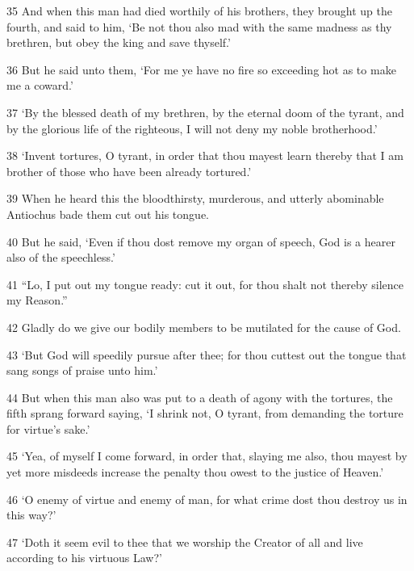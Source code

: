 \par 35 And when this man had died worthily of his brothers, they brought up the fourth, and said to him, ‘Be not thou also mad with the same madness as thy brethren, but obey the king and save thyself.’

\par 36 But he said unto them, ‘For me ye have no fire so exceeding hot as to make me a coward.’

\par 37 ‘By the blessed death of my brethren, by the eternal doom of the tyrant, and by the glorious life of the righteous, I will not deny my noble brotherhood.’

\par 38 ‘Invent tortures, O tyrant, in order that thou mayest learn thereby that I am brother of those who have been already tortured.’

\par 39 When he heard this the bloodthirsty, murderous, and utterly abominable Antiochus bade them cut out his tongue.

\par 40 But he said, ‘Even if thou dost remove my organ of speech, God is a hearer also of the speechless.’

\par 41 “Lo, I put out my tongue ready: cut it out, for thou shalt not thereby silence my Reason.”

\par 42 Gladly do we give our bodily members to be mutilated for the cause of God.

\par 43 ‘But God will speedily pursue after thee; for thou cuttest out the tongue that sang songs of praise unto him.’

\par 44 But when this man also was put to a death of agony with the tortures, the fifth sprang forward saying, ‘I shrink not, O tyrant, from demanding the torture for virtue's sake.’

\par 45 ‘Yea, of myself I come forward, in order that, slaying me also, thou mayest by yet more misdeeds increase the penalty thou owest to the justice of Heaven.’

\par 46 ‘O enemy of virtue and enemy of man, for what crime dost thou destroy us in this way?’

\par 47 ‘Doth it seem evil to thee that we worship the Creator of all and live according to his virtuous Law?’

